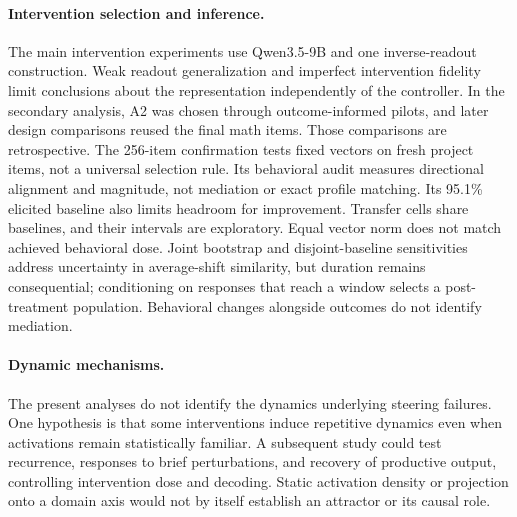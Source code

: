 \paragraph{Intervention selection and inference.}
The main intervention experiments use Qwen3.5-9B and one inverse-readout construction. Weak readout generalization and imperfect intervention fidelity limit conclusions about the representation independently of the controller. In the secondary analysis, A2 was chosen through outcome-informed pilots, and later design comparisons reused the final math items. Those comparisons are retrospective. The 256-item confirmation tests fixed vectors on fresh project items, not a universal selection rule. Its behavioral audit measures directional alignment and magnitude, not mediation or exact profile matching. Its 95.1\% elicited baseline also limits headroom for improvement. Transfer cells share baselines, and their intervals are exploratory. Equal vector norm does not match achieved behavioral dose. Joint bootstrap and disjoint-baseline sensitivities address uncertainty in average-shift similarity, but duration remains consequential; conditioning on responses that reach a window selects a post-treatment population. Behavioral changes alongside outcomes do not identify mediation.

\paragraph{Dynamic mechanisms.}
The present analyses do not identify the dynamics underlying steering failures. One hypothesis is that some interventions induce repetitive dynamics even when activations remain statistically familiar. A subsequent study could test recurrence, responses to brief perturbations, and recovery of productive output, controlling intervention dose and decoding. Static activation density or projection onto a domain axis would not by itself establish an attractor or its causal role.

